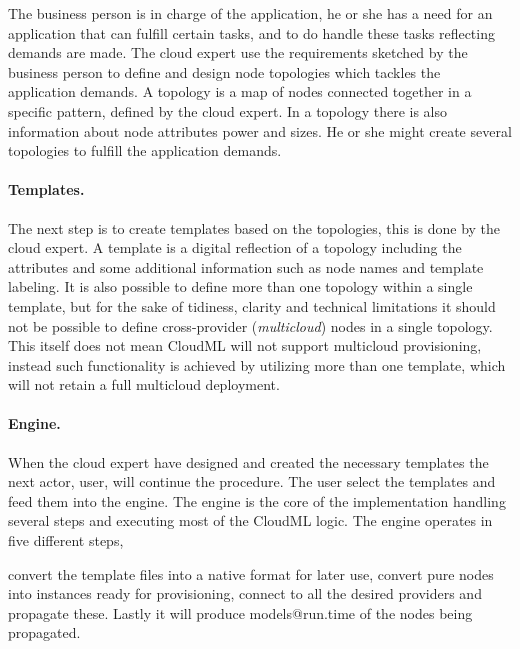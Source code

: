 The business person is in charge of the application, he or she has a need
for an application that can fulfill certain tasks, and to do handle these 
tasks reflecting demands are made.
The cloud expert use the requirements sketched by the business person to 
define and design node topologies which tackles the application demands.
A topology is a map of nodes connected together in a specific pattern, 
defined by the cloud expert.
In a topology there is also information about node attributes 
\eg {} power and  sizes.
He or she might create several topologies to fulfill the application demands.

\paragraph{Templates.}

The next step is to create templates based on the topologies, this is done by
the cloud expert.
A template is a digital reflection of a topology including the attributes and some additional 
information such as node names and template labeling.
It is also possible to define more than one topology within a single template,
but for the sake of tidiness, clarity and technical limitations it 
should not be possible to define cross-provider (\emph{multicloud}) nodes in a single topology.
This itself does not mean CloudML will not support multicloud provisioning,
instead such functionality is achieved by utilizing more than one template,
which will not retain a full multicloud deployment.

\paragraph{Engine.}

When the cloud expert have designed and created the necessary templates the next actor, 
user, will continue the procedure.
The user select the templates and feed them into the engine.
The engine is the core of the implementation handling several steps and executing
most of the CloudML logic.
The engine operates in five different steps, \
\begin{ii}
  \iitem convert the template files into a native format for later use, 
  \iitem convert pure nodes into instances ready for provisioning, 
  \iitem connect to all the desired providers and 
  \iitem propagate these. Lastly it will produce
  \iitem models@run.time of the nodes being propagated.
\end{ii}

